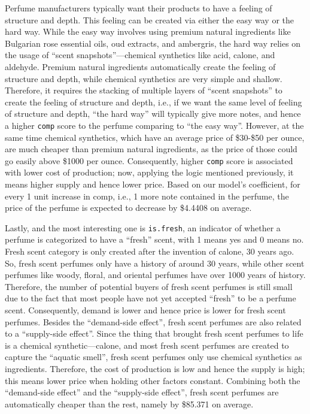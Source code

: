 \documentclass[12pt]{amsart}
\begin{document}
Perfume manufacturers typically want their products to have a feeling of structure and 
depth. This feeling can be created via either the easy way or the hard way. While the easy way 
involves using premium natural ingredients like Bulgarian rose essential oils, oud extracts, and 
ambergris, the hard way relies on the usage of “scent snapshots”—chemical synthetics like acid, 
calone, and aldehyde. Premium natural ingredients automatically create the feeling of structure 
and depth, while chemical synthetics are very simple and shallow. Therefore, it requires the 
stacking of multiple layers of “scent snapshots” to create the feeling of structure and depth, i.e., 
if we want the same level of feeling of structure and depth, “the hard way” will typically give 
more notes, and hence a higher \texttt{comp} score to the perfume comparing to “the easy way”. 
However, at the same time chemical synthetics, which have an average price of \$30-\$50 per 
ounce, are much cheaper than premium natural ingredients, as the price of those could go easily 
above \$1000 per ounce. Consequently, higher \texttt{comp} score is associated with lower cost of 
production; now, applying the logic mentioned previously, it means higher supply and hence 
lower price. Based on our model’s coefficient, for every 1 unit increase in comp, i.e., 1 more 
note contained in the perfume, the price of the perfume is expected to decrease by \$4.4408 on 
average.

Lastly, and the most interesting one is \texttt{is.fresh}, an indicator of whether a perfume is 
categorized to have a “fresh” scent, with 1 means yes and 0 means no. Fresh scent category is 
only created after the invention of calone, 30 years ago. So, fresh scent perfumes only have a 
history of around 30 years, while other scent perfumes like woody, floral, and oriental perfumes 
have over 1000 years of history. Therefore, the number of potential buyers of fresh scent 
perfumes is still small due to the fact that most people have not yet accepted “fresh” to be a 
perfume scent. Consequently, demand is lower and hence price is lower for fresh scent perfumes. 
Besides the “demand-side effect”, fresh scent perfumes are also related to a “supply-side effect”. 
Since the thing that brought fresh scent perfumes to life is a chemical synthetic—calone, and 
most fresh scent perfumes are created to capture the “aquatic smell”, fresh scent perfumes only 
use chemical synthetics as ingredients. Therefore, the cost of production is low and hence the 
supply is high; this means lower price when holding other factors constant. Combining both the
“demand-side effect” and the “supply-side effect”, fresh scent perfumes are automatically cheaper 
than the rest, namely by \$85.371 on average.
\end{document}
